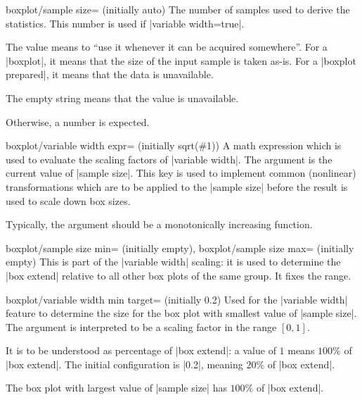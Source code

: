\begin{pgfplotskey}{boxplot/sample size= (initially auto)}
	The number of samples used to derive the statistics. This number is used if |variable width=true|.

	The value  means to ``use it whenever it can be acquired somewhere''. For a |boxplot|, it means that the size of the input sample is taken as-is. For a |boxplot prepared|, it means that the data is unavailable.

	The empty string means that the value is unavailable.

	Otherwise, a number is expected.
\end{pgfplotskey}

\begin{pgfplotskey}{boxplot/variable width expr= (initially {sqrt(\#1)})}
	A math expression which is used to evaluate the scaling factors of |variable width|. The argument is the current value of |sample size|. This key is used to implement common (nonlinear) transformations which are to be applied to the |sample size| before the result is used to scale down box sizes.

	Typically, the argument should be a monotonically increasing function.
\end{pgfplotskey}

\begin{pgfplotskeylist}{%
	boxplot/sample size min= (initially empty),
	boxplot/sample size max= (initially empty)%
}
	This is part of the |variable width| scaling: it is used to determine the |box extend| relative to all other box plots of the same group. It fixes the range.
\end{pgfplotskeylist}

\begin{pgfplotskey}{boxplot/variable width min target= (initially 0.2)}
	Used for the |variable width| feature to determine the size for the box plot with smallest value of |sample size|. The argument is interpreted to be a scaling factor in the range $[0,1]$. 

	It is to be understood as percentage of |box extend|: a value of $1$ means $100\%$ of |box extend|. The initial configuration is |0.2|, meaning $20\%$ of |box extend|.

	The box plot with largest value of |sample size| has $100\%$ of |box extend|.
\end{pgfplotskey}

